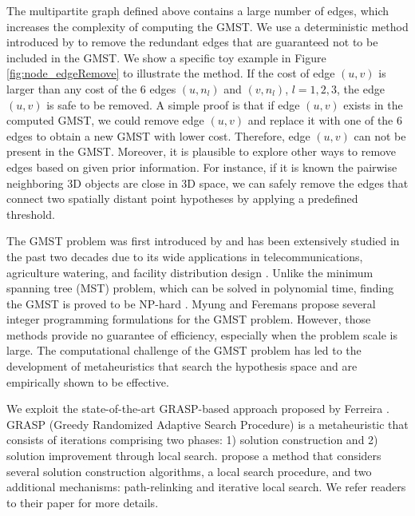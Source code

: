 The multipartite graph defined above contains a large number of edges, which increases the complexity of computing the GMST.
We use a deterministic method introduced by \citet{Ferreira_ESWA2012} to remove the redundant edges that are guaranteed not to be included in the GMST. We show a specific toy example in Figure \ref{fig:node_edgeRemove} to illustrate the method. If the cost of edge $(u,v)$ is larger than any cost of the 6 edges $(u,n_l)$ and $(v,n_l)$, $l=1,2,3$, the edge $(u,v)$ is safe to be removed. A simple proof is that if edge $(u,v)$ exists in the computed GMST, we could remove edge $(u,v)$ and replace it with one of the 6 edges to obtain a new GMST with lower cost. Therefore, edge $(u,v)$ can not be present in the GMST. Moreover, it is plausible to explore other ways to remove edges based on given prior information. For instance, if it is known the pairwise neighboring 3D objects are close in 3D space, we can safely remove the edges that connect two spatially distant point hypotheses by applying a predefined threshold.

The GMST problem was first introduced by \citet{MyungLT_95} and has been extensively studied in the past two decades \cite{MyungLT_95,Dror_EJOR,Feremans_LL02,Oncan_CL08,Ferreira_ESWA2012} due to its wide applications in  telecommunications, agriculture watering, and facility distribution design \cite{MyungLT_95,Dror_EJOR}. Unlike the minimum spanning tree (MST) problem, which can be solved in polynomial time, finding the GMST is proved to be NP-hard \cite{MyungLT_95}. Myung \etal \cite{MyungLT_95} and Feremans \etal \cite{Feremans_LL02} propose several integer programming formulations for the GMST problem. However, those methods provide no guarantee of efficiency, especially when the problem scale is large. The computational challenge of the GMST problem has led to the development of metaheuristics \cite{Oncan_CL08,Ferreira_ESWA2012} that search the hypothesis space and are empirically shown to be effective.

We exploit the state-of-the-art GRASP-based approach proposed by Ferreira \etal \cite{Ferreira_ESWA2012}. GRASP (Greedy Randomized Adaptive Search Procedure) is a metaheuristic that consists of iterations comprising two phases: 1) solution construction and 2) solution improvement through local search. \citet{Ferreira_ESWA2012} propose a method that considers several solution construction algorithms, a local search procedure, and two additional mechanisms: path-relinking and iterative local search. We refer readers to their paper \cite{Ferreira_ESWA2012} for more details.

